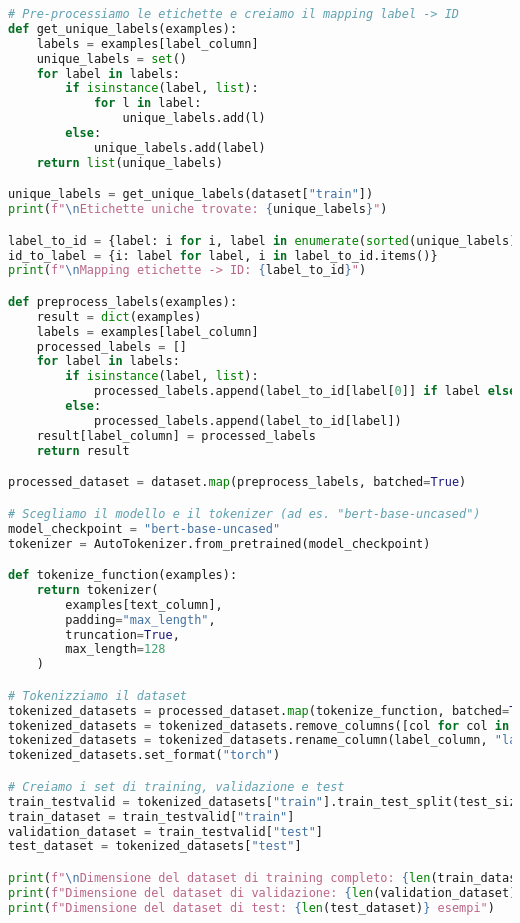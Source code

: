 \documentclass[11pt,a4paper]{article}
\begin{document}
\begin{lstlisting}[caption={Codice di Training per il Fine Tuning di BERT}, language=Python]
# Pre-processiamo le etichette e creiamo il mapping label -> ID
def get_unique_labels(examples):
    labels = examples[label_column]
    unique_labels = set()
    for label in labels:
        if isinstance(label, list):
            for l in label:
                unique_labels.add(l)
        else:
            unique_labels.add(label)
    return list(unique_labels)

unique_labels = get_unique_labels(dataset["train"])
print(f"\nEtichette uniche trovate: {unique_labels}")

label_to_id = {label: i for i, label in enumerate(sorted(unique_labels))}
id_to_label = {i: label for label, i in label_to_id.items()}
print(f"\nMapping etichette -> ID: {label_to_id}")

def preprocess_labels(examples):
    result = dict(examples)
    labels = examples[label_column]
    processed_labels = []
    for label in labels:
        if isinstance(label, list):
            processed_labels.append(label_to_id[label[0]] if label else 0)
        else:
            processed_labels.append(label_to_id[label])
    result[label_column] = processed_labels
    return result

processed_dataset = dataset.map(preprocess_labels, batched=True)

# Scegliamo il modello e il tokenizer (ad es. "bert-base-uncased")
model_checkpoint = "bert-base-uncased"
tokenizer = AutoTokenizer.from_pretrained(model_checkpoint)

def tokenize_function(examples):
    return tokenizer(
        examples[text_column],
        padding="max_length",
        truncation=True,
        max_length=128
    )

# Tokenizziamo il dataset
tokenized_datasets = processed_dataset.map(tokenize_function, batched=True)
tokenized_datasets = tokenized_datasets.remove_columns([col for col in processed_dataset["train"].column_names if col != label_column])
tokenized_datasets = tokenized_datasets.rename_column(label_column, "labels")
tokenized_datasets.set_format("torch")

# Creiamo i set di training, validazione e test
train_testvalid = tokenized_datasets["train"].train_test_split(test_size=0.2, seed=42)
train_dataset = train_testvalid["train"]
validation_dataset = train_testvalid["test"]
test_dataset = tokenized_datasets["test"]

print(f"\nDimensione del dataset di training completo: {len(train_dataset)} esempi")
print(f"Dimensione del dataset di validazione: {len(validation_dataset)} esempi")
print(f"Dimensione del dataset di test: {len(test_dataset)} esempi")


\end{lstlisting}
\end{document}
